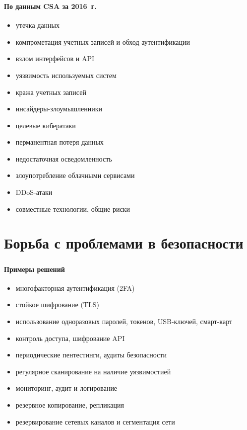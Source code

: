 \begin{frame}
\frametitle{\insertsection}
\framesubtitle{По данным CSA за 2016~г.}

\begin{itemize}
    \item утечка данных
    \item компрометация учетных записей и обход аутентификации
    \item взлом интерфейсов и API
    \item уязвимость используемых систем
    \item кража учетных записей
    \item инсайдеры-злоумышленники
    \item целевые кибератаки
    \item перманентная потеря данных
    \item недостаточная осведомленность
    \item злоупотребление облачными сервисами
    \item DDoS-атаки
    \item совместные технологии, общие риски
\end{itemize}
\end{frame}


\section{Борьба с проблемами в безопасности}

\begin{frame}
\frametitle{\insertsection}
\framesubtitle{Примеры решений}

\begin{itemize}
    \item многофакторная аутентификация (2FA)
    \item стойкое шифрование (TLS)
    \item использование одноразовых паролей, токенов, USB-ключей, смарт-карт
    \item контроль доступа, шифрование API
    \item периодические пентестинги, аудиты безопасности
    \item регулярное сканирование на наличие уязвимостией
    \item мониторинг, аудит и логирование
    \item резервное копирование, репликация
    \item резервирование сетевых каналов и сегментация сети
\end{itemize}
\end{frame}

